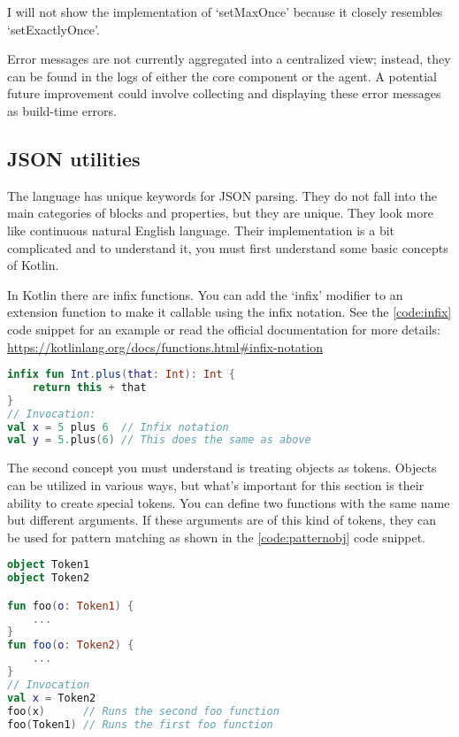 I will not show the implementation of `setMaxOnce' because it closely resembles `setExactlyOnce'.

Error messages are not currently aggregated into a centralized view; instead, they can be found in the logs of either the core component or the agent. A potential future improvement could involve collecting and displaying these error messages as build-time errors.

\subsection{JSON utilities}

The language has unique keywords for JSON parsing. They do not fall into the main categories of blocks and properties, but they are unique. They look more like continuous natural English language. Their implementation is a bit complicated and to understand it, you must first understand some basic concepts of Kotlin.

In Kotlin there are infix functions. You can add the `infix' modifier to an extension function to make it callable using the infix notation. See the \ref{code:infix} code snippet for an example or read the official documentation for more details: \url{https://kotlinlang.org/docs/functions.html#infix-notation}

\begin{lstlisting}[caption={Infix functions},language=Kotlin,label=code:infix]
infix fun Int.plus(that: Int): Int {
    return this + that
}
// Invocation:
val x = 5 plus 6  // Infix notation
val y = 5.plus(6) // This does the same as above
\end{lstlisting}

The second concept you must understand is treating objects as tokens. Objects can be utilized in various ways, but what's important for this section is their ability to create special tokens. You can define two functions with the same name but different arguments. If these arguments are of this kind of tokens, they can be used for pattern matching as shown in the \ref{code:patternobj} code snippet.

\begin{lstlisting}[caption={Pattern matching},language=Kotlin,label=code:patternobj]
object Token1
object Token2

fun foo(o: Token1) {
    ...
}
fun foo(o: Token2) {
    ...
}
// Invocation
val x = Token2
foo(x)      // Runs the second foo function
foo(Token1) // Runs the first foo function
\end{lstlisting}

